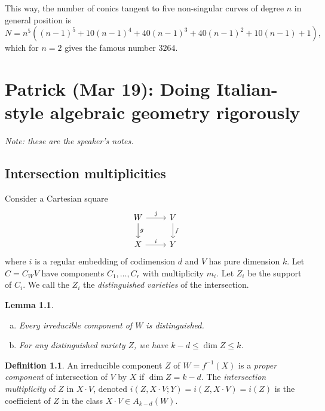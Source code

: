 \documentclass[leqno, openany]{memoir}
\newtheorem{lem}[thm]{Lemma}
\theoremstyle{definition}
\newtheorem{defn}[thm]{Definition}
\theoremstyle{remark}
\theoremstyle{plain}
\theoremstyle{definition}
\theoremstyle{remark}
\begin{document}
This way, the number of conics tangent to five non-singular curves of degree
$n$ in general position is \[ N=n^5({ (n-1) }^5+10{ (n-1) }^4+40{ (n-1) }^3+40{
(n-1) }^2+10(n-1)+1), \] which for $n=2$ gives the famous number $3264$. 

\chapter{Patrick (Mar 19): Doing Italian-style algebraic geometry rigorously}%
\label{cha:patrick_mar_19_doing_italian_style_algebraic_geometry_rigorously}

\textit{Note: these are the speaker's notes.} 

\section{Intersection multiplicities}%

Consider a Cartesian square \begin{equation*} \begin{tikzcd} W \ar{r}{j}
\ar{d}{g} & V \ar{d}{f} \\ X \ar{r}{i} & Y \end{tikzcd} \end{equation*} where
$i$ is a regular embedding of codimension $d$ and $V$ has pure dimension $k$.
Let $C = C_W V$ have components $C_1, \ldots, C_r$ with multiplicity $m_i$. Let
$Z_i$ be the support of $C_i$. We call the $Z_i$ the \textit{distinguished
varieties} of the intersection.

\begin{lem}\leavevmode \begin{enumerate}[(a)] \item Every irreducible component
of $W$ is distinguished.  \item For any distinguished variety $Z$, we have $k-d
\leq \dim Z \leq k$.  \end{enumerate} \end{lem}

\begin{defn} An irreducible component $Z$ of $W = f^{-1}(X)$ is a
    \textit{proper component} of intersection of $V$ by $X$ if $\dim Z = k-d$.
    The \textit{intersection multiplicity} of $Z$ in $X \cdot V$, denoted $i(Z,
    X \cdot V; Y) = i(Z, X \cdot V) = i(Z)$ is the coefficient of $Z$ in the
    class $X \cdot V \in A_{k-d}(W)$.  \end{defn}
\end{document}
